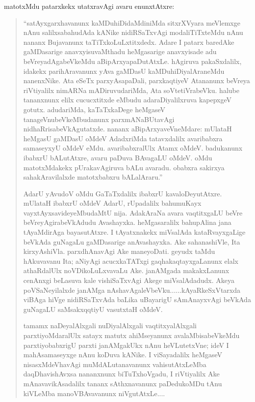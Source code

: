 matotxMdu patarxkekx utatxravAgi avaru enunxtAtxre:
\begin{quote}
``satAyxgarxhavanunx kaMDuhiDidaMdiniMda sitxrXVyara meVlemxge nAnu salilxsa\-bahudAda kANike nidiRSaTxvAgi modaliTiTxteMdu nAnu nananx Buja\-vanunx taTiTxkoLuLxtitxdedx. Adare I patarx baredAke gaMDasarige anavxyisuvaMthadu heMgasarige anavxyisade adu beVreyadAgabeVkeMdu aBipArxyapaDu\-tAtxLe. hAgiruva pakaSxdalilx, idakekx parihAravanunx yAva gaMDasU kaMDu\-hiDiyalAraneMdu nanenxNike. Ata eSeTx parxyAsapaDali, parxkaqtiyeV Ata\-nanunx beVreya riVtiyalilx nimARNa mADiruvudariMda, Ata soVte\-tiVrabeVku. halube tananxnunx elilx cucucxtitxde eMbudu adaraDiyalilxruva kapepxgeV gotutx. adudariMda, kaTaTxkaDege heMgaseV tanageVnubeVkeMbudanunx parxmANaBUtavAgi nidhaRrisabeVkAgutatxde. nananx aBipArxyaveVneMdare: mUlataH heMgasU gaMDasU oMdeV AdadxriMda tatavxdalilx avaribabxra samaseyxyU oMdeV eMdu. avaribabxralUlx Atamx oMdeV. badukanunx ibabxrU bALutAtxre, avaru paDuva BAvagaLU oMdeV. oMdu matotxM\-dakekx pUrakavAgiruva bALu avaradu. obabxra sakirxya sahakAravilalxde matotxbabxru bALalAraru.''


AdarU yAvudoV oMdu GaTaTxdalilx ibabxrU kavaloDeyutAtxre. mUlataH ibabxrU oMdeV AdarU, rUpadalilx bahumuKayx vayxtAyxsavideyeMbudaMtU nija. AdakAraNa avara vaqtitxgaLU beVre beVreyAgirabeVkAdudu Avashayxka. heMgasaralilx bahupAlina jana tAyaMdirAga bayasutAtxre. I tAyatxnakekx miVsalAda kataRvayxgaLige beVkAda guNagaLu gaMDasarige anAvashayxka. Ake sahanashiVle, Ita kirxyAshiVla. parxdhAnavAgi Ake maneyoDati. geyudx taMdu hAkuvavanu Ita; aNiyAgi acucxkaTATxgi gaqhakaqtayxgaLanunx elalx athaRdalUlx noVDikoLuLxvavaLu Ake. janAMgada makakxLanunx cenAnxgi beLasuva kale vishiSaTxvAgi Akege miVsalAdadudx. Akeya poVSaNeyilalxde janAMga nAshavAgaleVbeVku......kAyaRkeSxVtarxda viBAga hiVge nidiRSaTxvAda baLika uBayarigU sAmAnayxvAgi beVkAda guNagaLU saMsakxqqtiyU vasutxtaH oMdeV.

tamamx naDeyalAlxgali nuDiyalAlxgali vaqtitxyalAlxgali parxtiyoMdaralUlx satayx matutx ahiMseyanunx avalaMbisabeVkeMdu parxtiyobabxrigU parxti janAMgakUkx nAnu heVLutetxVne; ideV I mahAsamaseyxge nAnu koDuva kANike. I viSayadalilx heMgaseV nisasxMdeVhavAgi muMdALutanavanunx vahisutAtxLeMba daqDhavishAvxsa nananxnunx biTuTxhoVgadu, I riVtiyalilx Ake mAnavavikAsadalilx tananx sAthxnavanunx paDedukoMDu tAnu kiVLeMba manoVBAvavanunx niVgutAtxLe....


\end{quote}
